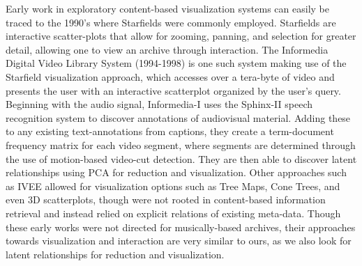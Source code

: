 Early work in exploratory content-based visualization systems can easily be traced to the 1990's where Starfields were commonly employed.  Starfields are interactive scatter-plots that allow for zooming, panning, and selection for greater detail, allowing one to view an archive through interaction.  The Informedia Digital Video Library System (1994-1998) \cite{Himmel1998,Christel1998} is one such system making use of the Starfield visualization approach, which accesses over a tera-byte of video and presents the user with an interactive scatterplot organized by the user's query.  Beginning with the audio signal, Informedia-I uses the Sphinx-II speech recognition system to discover annotations of audiovisual material.  Adding these to any existing text-annotations from captions, they create a term-document frequency matrix for each video segment, where segments are determined through the use of motion-based video-cut detection.  They are then able to discover latent relationships using PCA for reduction and visualization.  Other approaches such as IVEE \cite{Ahlberg1995} allowed for visualization options such as Tree Maps, Cone Trees, and even 3D scatterplots, though were not rooted in content-based information retrieval and instead relied on explicit relations of existing meta-data.  Though these early works were not directed for musically-based archives, their approaches towards visualization and interaction are very similar to ours, as we also look for latent relationships for reduction and visualization.

